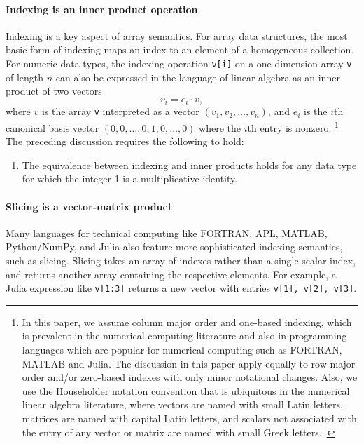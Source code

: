 \paragraph{Indexing is an inner product operation}
Indexing is a key aspect of array semantics. For array data structures, the
most basic form of indexing maps an index to an element of a homogeneous
collection. For numeric data types, the indexing operation \lstinline|v[i]| on
a one-dimension array \lstinline|v| of length $n$ can also be expressed in the
language of linear algebra as an inner product of two vectors
\begin{equation}
	v_i = e_i \cdot v,\label{eq:idx1}
\end{equation}
where $v$ is the array \lstinline|v| interpreted as a vector $(v_1, v_2, \dots,
v_n)$, and $e_i$ is the $i$th canonical basis vector $(0, 0, \dots, 0, 1, 0,
\dots, 0)$ where the $i$th entry is nonzero.%
\footnote{In this paper, we assume column major order and one-based indexing,
which is prevalent in the numerical computing literature and also in
programming languages which are popular for numerical computing such as
FORTRAN, MATLAB and Julia. The discussion in this paper apply equally to row
major order and/or zero-based indexes with only minor notational changes. Also,
we use the Householder notation convention that is ubiquitous in the numerical
linear algebra literature, where vectors are named with small Latin letters,
matrices are named with capital Latin letters, and scalars not associated with
the entry of any vector or matrix are named with small Greek
letters.~\cite{Householder1964}}
The preceding discussion requires the following to hold:

\begin{enumerate}[label=\bfseries{}A\arabic*]
\item The equivalence between indexing and inner products holds for
		any data type for which the integer 1 is a multiplicative
		identity. \label{point1}
\end{enumerate}
%
%


\paragraph{Slicing is a vector-matrix product}
Many languages for technical computing like FORTRAN, APL, MATLAB, Python/NumPy,
and Julia also feature more sophisticated indexing semantics, such as slicing.
Slicing takes an array of indexes rather than a single scalar index, and returns
another array containing the respective elements. For example, a Julia
expression like \lstinline|v[1:3]| returns a new vector with entries
\lstinline|v[1], v[2], v[3]|.

